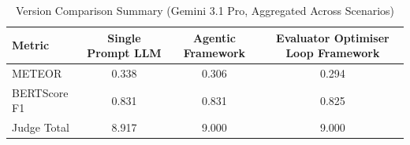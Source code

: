 \begin{table}[htbp]
\centering
\caption{Version Comparison Summary (Gemini 3.1 Pro, Aggregated Across Scenarios)}
\label{tab:version_summary_gemini}
\begin{tabular}{lccc}
\toprule
Metric & Single Prompt LLM & Agentic Framework & Evaluator Optimiser Loop Framework \\
\midrule
METEOR & 0.338 & 0.306 & 0.294 \\
BERTScore F1 & 0.831 & 0.831 & 0.825 \\
Judge Total & 8.917 & 9.000 & 9.000 \\
\bottomrule
\end{tabular}
\end{table}